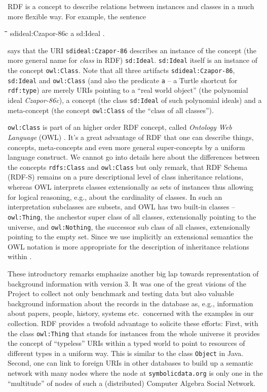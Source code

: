 \documentclass[a4paper,11pt]{article}
\newenvironment{code}{\par\small\tt\footnotesize \begin{tabbing}
\hskip12pt\=\hskip12pt\=\hskip12pt\=\hskip12pt\=\hskip5cm\=\hskip5cm\=\kill}
{\end{tabbing}\normalsize}
\begin{document}
\begin{multicols}{2}
RDF is a concept to describe relations between instances and classes in a much
more flexible way.  For example, the sentence
\begin{code}
  sdideal:Czapor-86c a sd:Ideal . 
\end{code}
says that the URI \texttt{sdideal:Czapor-86} describes an instance of the
concept (the more general name for \emph{class} in RDF) \texttt{sd:Ideal}.
\texttt{sd:Ideal} itself is an instance of the concept \texttt{owl:Class}.
Note that all three artifacts \texttt{sdideal:Czapor-86}, \texttt{sd:Ideal} and
\texttt{owl:Class} (and also the predicate \texttt{a} -- a Turtle shortcut for
\texttt{rdf:type}) are merely URIs pointing to a ``real world object'' (the
polynomial ideal \emph{Czapor-86c}\/), a concept (the class \texttt{sd:Ideal}
of such polynomial ideals) and a meta-concept (the concept \texttt{owl:Class}
of the ``class of all classes'').

\texttt{owl:Class} is part of an higher order RDF concept, called
\emph{Ontology Web Language} (OWL) \cite{owl}. It's a great advantage of RDF
that one can describe things, concepts, meta-concepts and even more general
super-concepts by a uniform language construct.  We cannot go into details here
about the differences between the concepts \texttt{rdfs:Class} and
\texttt{owl:Class} but only remark, that RDF Schema (RDF-S) \cite{rdfs} remains
on a pure descriptional level of class inheritance relations, whereas OWL
interprets classes extensionally as sets of instances thus allowing for logical
reasoning, e.g., about the cardinality of classes.  In such an interpretation
subclasses are subsets, and OWL has two built-in classes -- \texttt{owl:Thing},
the anchestor super class of all classes, extensionally pointing to the
universe, and \texttt{owl:Nothing}, the successor sub class of all classes,
extensionally pointing to the empty set.  Since we use implicitly an
extensional semantics the OWL notation is more appropriate for the description
of inheritance relations within {\SD}.

These introductory remarks emphasize another big lap towards representation of
background information with {\SD} version 3.  It was one of the great visions
of the {\SD} Project to collect not only benchmark and testing data but also
valuable background information about the records in the database as, e.g.,
information about papers, people, history, systems etc.\ concerned with the
examples in our collection.  RDF provides a twofold advantage to solicite these
efforts: First, with the class \texttt{owl:Thing} that stands for instances
from the whole universe it provides the concept of ``typeless'' URIs within a
typed world to point to resources of different types in a uniform way.  This is
similar to the class \texttt{Object} in Java.  Second, one can link to foreign
URIs in other databases to build up a semantic network with many nodes where
the node at \texttt{symbolicdata.org} is only one in the ``multitude'' of nodes
of such a (distributed) Computer Algebra Social Network.


\end{multicols}
\end{document}
